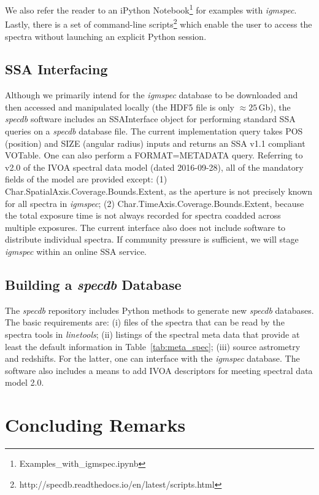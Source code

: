 \documentclass[12pt]{elsarticle}
\begin{document}
We also refer the reader to an iPython 
Notebook\footnote{Examples\_with\_igmspec.ipynb}
for examples with {\it igmspec}. 
Lastly, there is a set of command-line 
scripts\footnote{http://specdb.readthedocs.io/en/latest/scripts.html}
which enable the user to access the spectra without
launching an explicit Python session.


\subsection{SSA Interfacing}

Although we primarily intend for the {\it igmspec} database
to be downloaded and then
accessed and manipulated locally 
(the HDF5 file is only $\approx 25$\,Gb),
the {\it specdb} software includes an SSAInterface object for 
performing standard SSA queries on a {\it specdb} database file.
The current implementation query 
takes POS (position) and SIZE (angular radius) 
inputs and returns an SSA v1.1 compliant VOTable. 
One can also perform a FORMAT=METADATA query.
Referring to v2.0 of the IVOA spectral data model (dated
2016-09-28),  all of the mandatory fields of the model
are provided except: (1) Char.SpatialAxis.Coverage.Bounds.Extent,
as the aperture is not precisely known for all spectra in
{\it igmspec};
(2) Char.TimeAxis.Coverage.Bounds.Extent, because
the total exposure time is not always recorded for 
spectra coadded across multiple exposures.
The current interface also does not include software
to distribute individual spectra.  If community pressure is
sufficient, we will stage {\it igmspec} within an online 
SSA service.

\subsection{Building a {\it specdb} Database}

The {\it specdb} repository includes Python methods 
to generate new {\it specdb} databases.
The basic requirements are:
 (i) files of the spectra that can be read by the spectra
 tools in {\it linetools};
 (ii) listings of the spectral meta data that provide at least
 the default information in Table~\ref{tab:meta_spec};
 (iii) source astrometry and redshifts.
For the latter, one can interface with the {\it igmspec} database.
The software also includes a means to add IVOA descriptors
for meeting spectral data model 2.0.  

\section{Concluding Remarks}
\label{sec:end}
\end{document}

